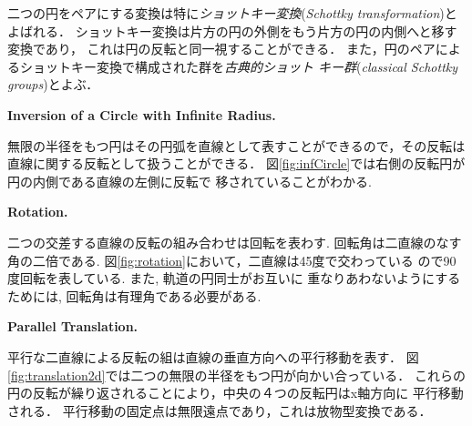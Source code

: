 二つの円をペアにする変換は特に\emph{ショットキー変換}(\textit{Schottky
transformation})とよばれる．
ショットキー変換は片方の円の外側をもう片方の円の内側へと移す変換であり，
これは円の反転と同一視することができる．
また，円のペアによるショットキー変換で構成された群を\emph{古典的ショット
キー群}(\textit{classical Schottky groups})とよぶ．

\noindent\textbf{Inversion of a Circle with Infinite Radius.}

無限の半径をもつ円はその円弧を直線として表すことができるので，その反転は
直線に関する反転として扱うことができる．
図\ref{fig:infCircle}では右側の反転円が円の内側である直線の左側に反転で
移されていることがわかる.

\noindent\textbf{Rotation.}

二つの交差する直線の反転の組み合わせは回転を表わす. 回転角は二直線のなす
角の二倍である. 図\ref{fig:rotation}において，二直線は45度で交わっている
ので90度回転を表している. また, 軌道の円同士がお互いに
重なりあわないようにするためには, 回転角は有理角である必要がある.

\noindent\textbf{Parallel Translation.}

平行な二直線による反転の組は直線の垂直方向への平行移動を表す．
図\ref{fig:translation2d}では二つの無限の半径をもつ円が向かい合っている．
これらの円の反転が繰り返されることにより，中央の４つの反転円はx軸方向に
平行移動される．
平行移動の固定点は無限遠点であり，これは放物型変換である．

